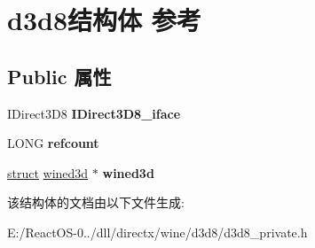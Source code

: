 \hypertarget{structd3d8}{}\section{d3d8结构体 参考}
\label{structd3d8}
\subsection*{Public 属性}
\begin{DoxyCompactItemize}
\item 
\mbox{\label{structd3d8_a91f8162210fa62d55b7976095c73048c}} 
I\+Direct3\+D8 {\bfseries I\+Direct3\+D8\+\_\+iface}
\item 
\mbox{\label{structd3d8_a4586eeeb07a6c19fa0a999d45b55172f}} 
L\+O\+NG {\bfseries refcount}
\item 
\mbox{\label{structd3d8_afe5f4858680479aef25eedd75cb76272}} 
\hyperlink{interfacestruct}{struct} \hyperlink{structwined3d}{wined3d} $\ast$ {\bfseries wined3d}
\end{DoxyCompactItemize}


该结构体的文档由以下文件生成\+:\begin{DoxyCompactItemize}
\item 
E\+:/\+React\+O\+S-\/0../dll/directx/wine/d3d8/d3d8\+\_\+private.\+h\end{DoxyCompactItemize}
